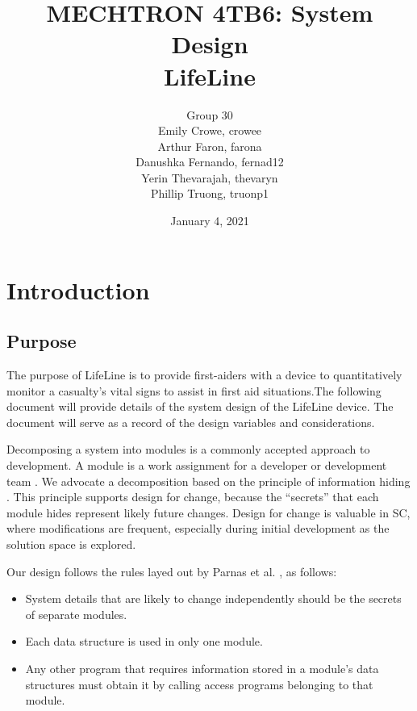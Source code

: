 \documentclass{article}
\title{MECHTRON 4TB6: System Design \\ LifeLine}
\author{Group 30 \\ Emily Crowe, crowee \\ Arthur Faron, farona \\ Danushka Fernando, fernad12 \\Yerin Thevarajah, thevaryn \\ Phillip Truong, truonp1}
\begin{document}
    \date{January 4, 2021}
	\maketitle
	
	\newpage
	
	\begin{versionhistory}
	\end{versionhistory}
	
	\newpage
    
	\tableofcontents
	\listoffigures
    \listoftables

	\newpage

    \section{Introduction}
	\subsection{Purpose}
	The purpose of LifeLine is to provide first-aiders with a device to quantitatively monitor a casualty's vital signs to assist in first aid situations.The following document will provide details of the system design of the LifeLine device. The document will serve as a record of the design variables and considerations.
    
    Decomposing a system into modules is a commonly accepted approach to development.  A module is a work assignment for a developer or development team \citep{ParnasEtAl1984}.  We advocate a decomposition
    based on the principle of information hiding \citep{Parnas1972a}.  This
    principle supports design for change, because the ``secrets'' that each module
    hides represent likely future changes.  Design for change is valuable in SC,
    where modifications are frequent, especially during initial development as the
    solution space is explored.  
    
    Our design follows the rules layed out by Parnas et al. \citep{ParnasEtAl1984}, as follows:
    \begin{itemize}
    \item System details that are likely to change independently should be the
      secrets of separate modules.
    \item Each data structure is used in only one module.
    \item Any other program that requires information stored in a module's data
      structures must obtain it by calling access programs belonging to that module.
    \end{itemize}
    
\end{document}
